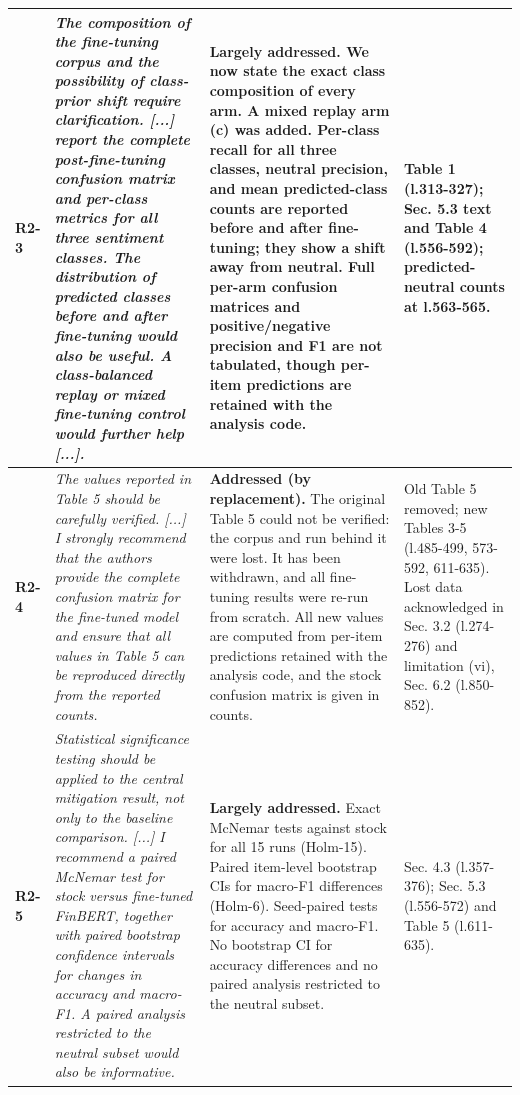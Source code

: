 \documentclass[10pt]{article}
\begin{document}
\begin{longtable}{>{\raggedright\arraybackslash}p{1.1cm}>{\raggedright\arraybackslash}p{8.2cm}>{\raggedright\arraybackslash}p{9.0cm}>{\raggedright\arraybackslash}p{6.0cm}}
\textbf{R2-3} & \emph{The composition of the fine-tuning corpus and the possibility of class-prior shift require clarification. [...] report the complete post-fine-tuning confusion matrix and per-class metrics for all three sentiment classes. The distribution of predicted classes before and after fine-tuning would also be useful. A class-balanced replay or mixed fine-tuning control would further help [...].} & \textbf{Largely addressed.} We now state the exact class composition of every arm. A mixed replay arm (c) was added. Per-class recall for all three classes, neutral precision, and mean predicted-class counts are reported before and after fine-tuning; they show a shift away from neutral. Full per-arm confusion matrices and positive/negative precision and F1 are not tabulated, though per-item predictions are retained with the analysis code. & Table 1 (l.313-327); Sec. 5.3 text and Table 4 (l.556-592); predicted-neutral counts at l.563-565. \\ \midrule
\textbf{R2-4} & \emph{The values reported in Table 5 should be carefully verified. [...] I strongly recommend that the authors provide the complete confusion matrix for the fine-tuned model and ensure that all values in Table 5 can be reproduced directly from the reported counts.} & \textbf{Addressed (by replacement).} The original Table 5 could not be verified: the corpus and run behind it were lost. It has been withdrawn, and all fine-tuning results were re-run from scratch. All new values are computed from per-item predictions retained with the analysis code, and the stock confusion matrix is given in counts. & Old Table 5 removed; new Tables 3-5 (l.485-499, 573-592, 611-635). Lost data acknowledged in Sec. 3.2 (l.274-276) and limitation (vi), Sec. 6.2 (l.850-852). \\ \midrule
\textbf{R2-5} & \emph{Statistical significance testing should be applied to the central mitigation result, not only to the baseline comparison. [...] I recommend a paired McNemar test for stock versus fine-tuned FinBERT, together with paired bootstrap confidence intervals for changes in accuracy and macro-F1. A paired analysis restricted to the neutral subset would also be informative.} & \textbf{Largely addressed.} Exact McNemar tests against stock for all 15 runs (Holm-15). Paired item-level bootstrap CIs for macro-F1 differences (Holm-6). Seed-paired tests for accuracy and macro-F1. No bootstrap CI for accuracy differences and no paired analysis restricted to the neutral subset. & Sec. 4.3 (l.357-376); Sec. 5.3 (l.556-572) and Table 5 (l.611-635). \\ \midrule

\end{longtable}
\end{document}
